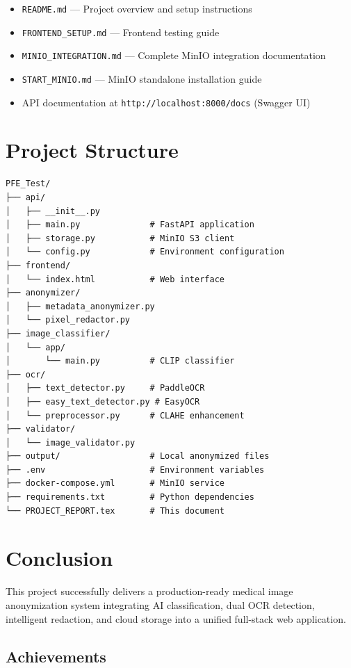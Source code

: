 \documentclass[12pt,a4paper]{article}
\begin{document}
\begin{itemize}[leftmargin=1.2cm]
    \item \texttt{README.md} — Project overview and setup instructions
    \item \texttt{FRONTEND\_SETUP.md} — Frontend testing guide
    \item \texttt{MINIO\_INTEGRATION.md} — Complete MinIO integration documentation
    \item \texttt{START\_MINIO.md} — MinIO standalone installation guide
    \item API documentation at \texttt{http://localhost:8000/docs} (Swagger UI)
\end{itemize}

\section{Project Structure}

\begin{verbatim}
PFE_Test/
├── api/
│   ├── __init__.py
│   ├── main.py              # FastAPI application
│   ├── storage.py           # MinIO S3 client
│   └── config.py            # Environment configuration
├── frontend/
│   └── index.html           # Web interface
├── anonymizer/
│   ├── metadata_anonymizer.py
│   └── pixel_redactor.py
├── image_classifier/
│   └── app/
│       └── main.py          # CLIP classifier
├── ocr/
│   ├── text_detector.py     # PaddleOCR
│   ├── easy_text_detector.py # EasyOCR
│   └── preprocessor.py      # CLAHE enhancement
├── validator/
│   └── image_validator.py
├── output/                  # Local anonymized files
├── .env                     # Environment variables
├── docker-compose.yml       # MinIO service
├── requirements.txt         # Python dependencies
└── PROJECT_REPORT.tex       # This document
\end{verbatim}

\section{Conclusion}

This project successfully delivers a production-ready medical image anonymization system integrating AI classification, dual OCR detection, intelligent redaction, and cloud storage into a unified full-stack web application.

\subsection{Achievements}
\end{document}
